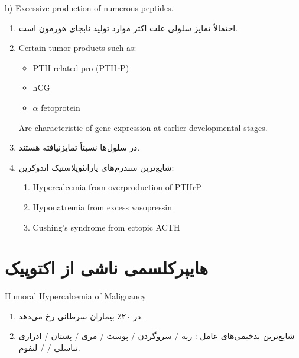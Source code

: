 \documentclass[a4paper,12pt]{article}
\begin{document}
\begin{latin}
\noindent b) Excessive production of numerous peptides.
\end{latin}
\begin{enumerate}[label=\arabic*.,start=7]
\item احتمالاً تمایز سلولی علت اکثر موارد تولید نابجای هورمون است.
\item {}
\begin{latin}
\noindent Certain tumor products such as:
\begin{itemize}
\item PTH related pro (PTHrP)
\item hCG
\item $\alpha$ fetoprotein
\end{itemize}
Are characteristic of gene expression at earlier developmental stages.
\end{latin}
\item در  سلول‌ها نسبتاً تمایزنیافته هستند.
\item شایع‌ترین سندرم‌های پارانئوپلاستیک اندوکرین:
\begin{latin}
\begin{enumerate}[label=\alph*)]
\item Hypercalcemia from overproduction of PTHrP
\item Hyponatremia from excess vasopressin
\item Cushing's syndrome from ectopic ACTH
\end{enumerate}
\end{latin}
\end{enumerate}
\section*{هایپرکلسمی ناشی از  اکتوپیک}
\begin{latin}\noindent Humoral Hypercalcemia of Malignancy\end{latin}
\begin{enumerate}[label=\arabic*.,start=1]
\item {} در ۲۰٪ بیماران سرطانی رخ می‌دهد.
\item شایع‌ترین بدخیمی‌های عامل : ریه / سروگردن / پوست / مری / پستان / ادراری تناسلی /  / لنفوم.
\end{enumerate}
\end{document}
